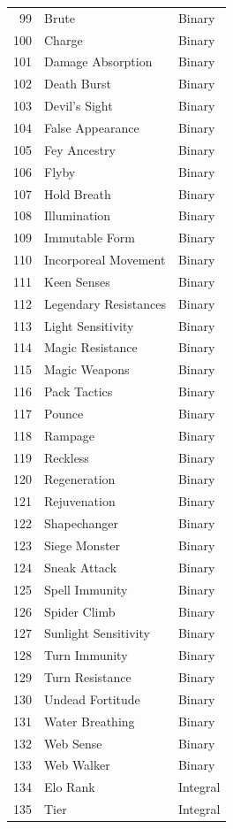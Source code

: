 \documentclass{article}
\begin{document}
\begin{table}[ht]
\begin{tiny}
\begin{minipage}[b]{0.45\linewidth}
\begin{tabular}{@{}rll@{}}
	99 & Brute & Binary \\
	100 & Charge & Binary \\
	101 & Damage Absorption & Binary \\
	102 & Death Burst & Binary \\
	103 & Devil's Sight & Binary \\
	104 & False Appearance & Binary \\
	105 & Fey Ancestry & Binary \\
	106 & Flyby & Binary \\
	107 & Hold Breath & Binary \\
	108 & Illumination & Binary \\
	109 & Immutable Form & Binary \\
	110 & Incorporeal Movement & Binary \\
	111 & Keen Senses & Binary \\
	112 & Legendary Resistances & Binary \\
	113 & Light Sensitivity & Binary \\
	114 & Magic Resistance & Binary \\
	115 & Magic Weapons & Binary \\
	116 & Pack Tactics & Binary \\
	117 & Pounce & Binary \\
	118 & Rampage & Binary \\
	119 & Reckless & Binary \\
	120 & Regeneration & Binary \\
	121 & Rejuvenation & Binary \\
	122 & Shapechanger & Binary \\
	123 & Siege Monster & Binary \\
	124 & Sneak Attack & Binary \\
	125 & Spell Immunity & Binary \\
	126 & Spider Climb & Binary \\
	127 & Sunlight Sensitivity & Binary \\
	128 & Turn Immunity & Binary \\
	129 & Turn Resistance & Binary \\
	130 & Undead Fortitude & Binary \\
	131 & Water Breathing & Binary \\
	132 & Web Sense & Binary \\
	133 & Web Walker & Binary \\
	134 & Elo Rank & Integral \\
	135 & Tier & Integral \\
	\bottomrule
\end{tabular}
\end{minipage}
\end{tiny}

\end{table}
\end{document}
